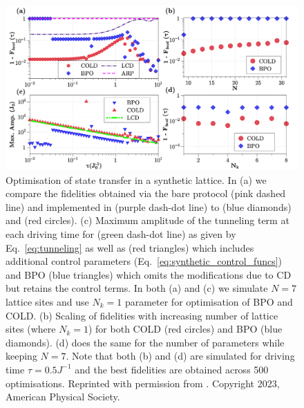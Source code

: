 \begin{figure}[t]
    \centering
    \includegraphics[width=\linewidth]{images/synthetic_lattice.png} \caption[COLD plots for ARP transport in a synthetic lattice]{Optimisation of state transfer in a synthetic lattice.  In (a) we compare the fidelities obtained via the bare  protocol (pink dashed line) and   implemented in \cite{meier_counterdiabatic_2020} (purple dash-dot line) to  (blue diamonds) and  (red circles). (c) Maximum amplitude of the tunneling term at each driving time for  (green dash-dot line) as given by Eq.~\eqref{eq:tunneling} as well as  (red triangles) which includes additional control parameters (Eq.~\eqref{eq:synthetic_control_funcs}) and BPO (blue triangles) which omits the modifications due to CD but retains the control terms. In both (a) and (c) we simulate $N = 7$ lattice sites and use $N_k = 1$ parameter for optimisation of BPO and COLD.  (b) Scaling of fidelities with increasing number of lattice sites (where $N_k = 1$) for both COLD (red circles) and BPO (blue diamonds). (d) does the same for the number of parameters while keeping $N=7$.  Note that both (b) and (d) are simulated for driving time $\tau = 0.5 J^{-1}$ and the best fidelities are obtained across 500 optimisations. Reprinted with permission from \cite{cepaite_counterdiabatic_2023}. Copyright 2023, American Physical Society.}\label{fig:Synthetic}
\end{figure}

